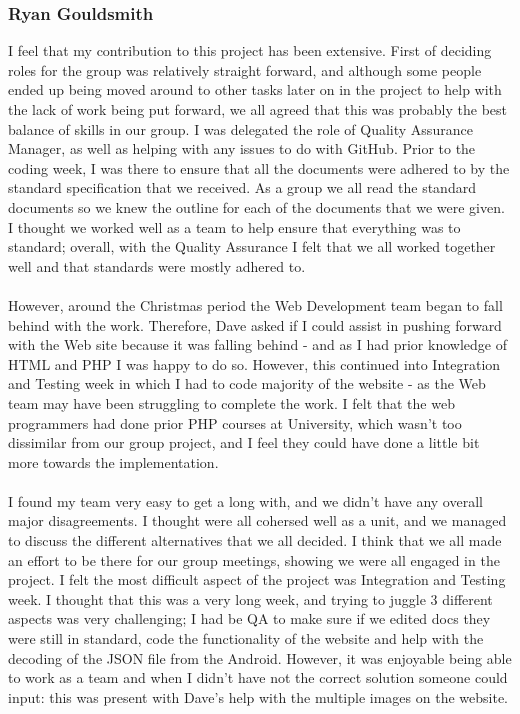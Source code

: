 \documentclass[12pt, portrait]{article}
\begin{document}
\subsubsection{Ryan Gouldsmith}
I feel that my contribution to this project has been extensive. First of deciding roles for the group was relatively straight forward, and although some people ended up being moved around to other tasks later on in the project to help with the lack of work being put forward, we all agreed that this was probably the best balance of skills in our group. I was delegated the role of Quality Assurance Manager, as well as helping with any issues to do with GitHub. Prior to the coding week, I was there to ensure that all the documents were adhered to by the standard specification that we received. As a group we all read the standard documents so we knew the outline for each of the documents that we were given. I thought we worked well as a team to help ensure that everything was to standard; overall, with the Quality Assurance I felt that we all worked together well and that standards were mostly adhered to.
~\\\\
However, around the Christmas period the Web Development team began to fall behind with the work. Therefore, Dave asked if I could assist in pushing forward with the Web site because it was falling behind - and as I had prior knowledge of HTML and PHP I was happy to do so. However, this continued into Integration and Testing week in which I had to code majority of the website - as the Web team may have been struggling to complete the work. I felt that the web programmers had done prior PHP courses at University, which wasn't too dissimilar from our group project, and I feel they could have done a little bit more towards the implementation.
~\\\\
I found my team very easy to get a long with, and we didn't have any overall major disagreements. I thought were all cohersed well as a unit, and we managed to discuss the different alternatives that we all decided. I think that we all made an effort to be there for our group meetings, showing we were all engaged in the project. I felt the most difficult aspect of the project was Integration and Testing week. I thought that this was a very long week, and trying to juggle 3 different aspects was very challenging; I had be QA to make sure if we edited docs they were still in standard, code the functionality of the website and help with the decoding of the JSON file from the Android. However, it was enjoyable being able to work as a team and when I didn't have not the correct solution someone could input: this was present with Dave's help with the multiple images on the website. 
\end{document}
